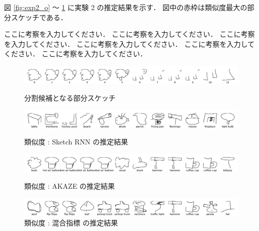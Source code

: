 \documentclass[twocolumn]{jarticle}     %
\begin{document}
図 \ref{fig:exp2_o} ～ \ref{fig:exp2_c} に実験 2 の推定結果を示す．
図中の赤枠は類似度最大の部分スケッチである．

ここに考察を入力してください．
ここに考察を入力してください．
ここに考察を入力してください．
ここに考察を入力してください．
ここに考察を入力してください．
ここに考察を入力してください．

\begin{figure}[tb]

 \begin{minipage}{1\hsize}
 	\begin{center}
 		\includegraphics[clip,width=170mm]{origin.png}
 		\caption{分割候補となる部分スケッチ}
 		\label{fig:exp2_o}
 	\end{center}
 \end{minipage}
\vspace{2zh}

  \begin{minipage}{1\hsize}
  	\begin{center}
  		\includegraphics[clip,width=170mm]{sheep_a.png}
  		\caption{類似度 : Sketch RNN の推定結果}
  		\label{fig:exp2_a}
  	\end{center}
  \end{minipage}
 \vspace{1.5zh}

   \begin{minipage}{1\hsize}
     \begin{center}
       \includegraphics[clip,width=170mm]{sheep_b.png}
       \caption{類似度 : AKAZE の推定結果}
       \label{fig:exp2_b}
     \end{center}
   \end{minipage}
  \vspace{1.5zh}

    \begin{minipage}{1\hsize}
      \begin{center}
        \includegraphics[clip,width=170mm]{sheep_c.png}
        \caption{類似度 : 混合指標 の推定結果}
        \label{fig:exp2_c}
      \end{center}
    \end{minipage}

    \vspace{1zh}

\end{figure}
\end{document}
